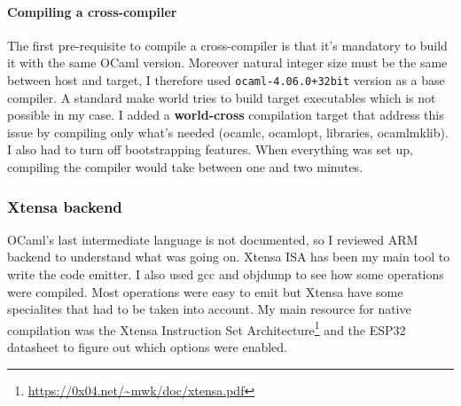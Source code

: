 \documentclass[a4paper]{article}
\begin{document}
\paragraph{Compiling a cross-compiler}
The first pre-requisite to compile a cross-compiler is that it's mandatory to build it with the same OCaml version. Moreover natural integer size must be the same between host and target, I therefore used \texttt{ocaml-4.06.0+32bit} version as a base compiler. 
A standard make world tries to build target executables which is not possible in my case. I added a \textbf{world-cross} compilation target that address this issue by compiling only what's needed (ocamlc, ocamlopt, libraries, ocamlmklib). I also had to turn off bootstrapping features. When everything was set up, compiling the compiler would take between one and two minutes.

\subsubsection{Xtensa backend}
OCaml's last intermediate language is not documented, so I reviewed ARM backend to understand what was going on. Xtensa ISA has been my main tool to write the code emitter. I also used gcc and objdump to see how some operations were compiled. Most operations were easy to emit but Xtensa have some specialites that had to be taken into account. My main resource for native compilation was the Xtensa Instruction Set Architecture\footnote{\url{https://0x04.net/~mwk/doc/xtensa.pdf}} and the ESP32 datasheet to figure out which options were enabled.
\end{document}
